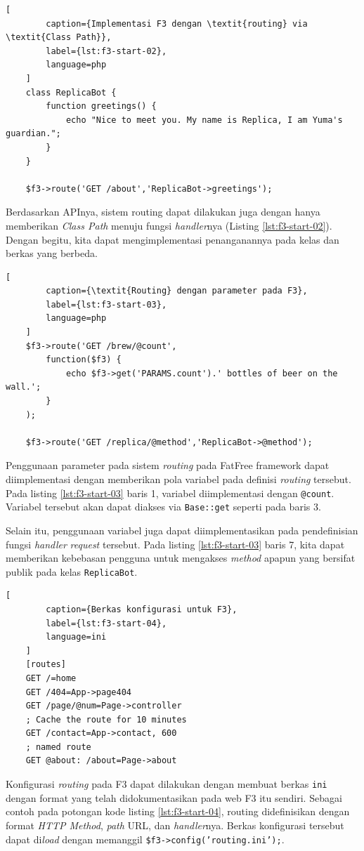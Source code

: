     \begin{lstlisting}[
        caption={Implementasi F3 dengan \textit{routing} via \textit{Class Path}},
        label={lst:f3-start-02},
        language=php
    ]
    class ReplicaBot {
        function greetings() {
            echo "Nice to meet you. My name is Replica, I am Yuma's guardian.";
        }
    }
    
    $f3->route('GET /about','ReplicaBot->greetings');
    \end{lstlisting}

    Berdasarkan APInya, sistem routing dapat dilakukan juga dengan hanya
    memberikan \textit{Class Path} menuju fungsi \textit{handler}nya (Listing
    \ref{lst:f3-start-02}). Dengan begitu, kita dapat mengimplementasi
    penanganannya pada kelas dan berkas yang berbeda.
    
    \begin{lstlisting}[
        caption={\textit{Routing} dengan parameter pada F3},
        label={lst:f3-start-03},
        language=php
    ]
    $f3->route('GET /brew/@count',
        function($f3) {
            echo $f3->get('PARAMS.count').' bottles of beer on the wall.';
        }
    );
    
    $f3->route('GET /replica/@method','ReplicaBot->@method');
    \end{lstlisting}
    Penggunaan parameter pada sistem \textit{routing} pada FatFree framework
    dapat diimplementasi dengan memberikan pola variabel pada definisi
    \textit{routing} tersebut. Pada listing \ref{lst:f3-start-03} baris 1,
    variabel diimplementasi dengan
    \texttt{@count}. Variabel tersebut akan dapat diakses via \texttt{Base::get}
    seperti pada baris 3.
    
    Selain itu, penggunaan variabel juga dapat diimplementasikan pada
    pendefinisian fungsi \textit{handler} \textit{request} tersebut. Pada
    listing \ref{lst:f3-start-03} baris 7, kita dapat memberikan kebebasan
    pengguna untuk mengakses \textit{method} apapun yang bersifat publik pada
    kelas \texttt{ReplicaBot}.
    \begin{lstlisting}[
        caption={Berkas konfigurasi untuk F3},
        label={lst:f3-start-04},
        language=ini
    ]
    [routes]
    GET /=home
    GET /404=App->page404
    GET /page/@num=Page->controller
    ; Cache the route for 10 minutes
    GET /contact=App->contact, 600
    ; named route
    GET @about: /about=Page->about
    \end{lstlisting}
    Konfigurasi \textit{routing} pada F3 dapat dilakukan dengan membuat berkas
    \texttt{ini} dengan format yang telah didokumentasikan pada web F3 itu
    sendiri. Sebagai contoh pada potongan kode listing \ref{lst:f3-start-04},
    routing didefinisikan dengan format \textit{HTTP Method}, \textit{path}
    URL, dan \textit{handler}nya. Berkas konfigurasi tersebut dapat
    di\textit{load} dengan memanggil \texttt{\$f3->config('routing.ini');}.
     
